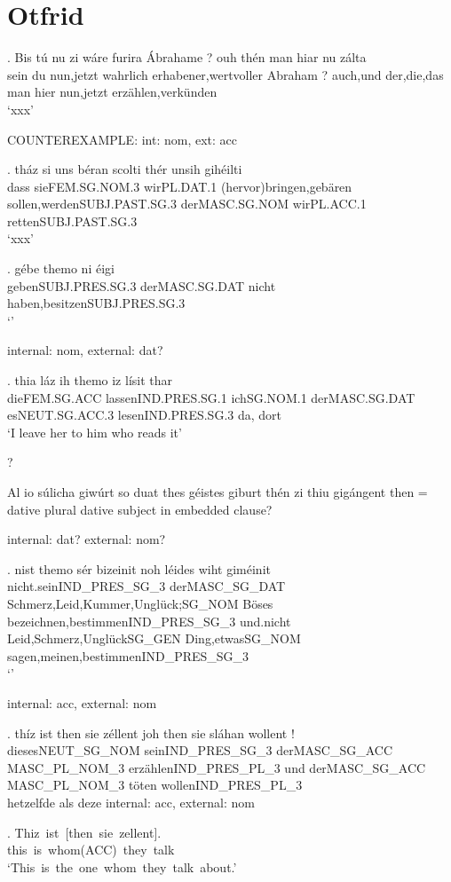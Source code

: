 \phantom{x}

\section{Otfrid}

\exg. Bis tú nu {zi wáre} furira Ábrahame ? ouh thén man hiar nu zálta\\
 sein du nun,jetzt wahrlich erhabener,wertvoller Abraham ? auch,und der,die,das man hier nun,jetzt erzählen,verkünden\\
 `xxx' \label{ex:ohg-dat-acc}

COUNTEREXAMPLE: int: nom, ext: acc

\exg. tház	si	uns	béran	scolti	thér	unsih	gihéilti\\
dass	sieFEM.SG.NOM.3	wirPL.DAT.1	(hervor)bringen,gebären	sollen,werdenSUBJ.PAST.SG.3	derMASC.SG.NOM	wirPL.ACC.1	rettenSUBJ.PAST.SG.3\\
 `xxx' 

 \exg. gébe themo	ni	éigi\\
 gebenSUBJ.PRES.SG.3	derMASC.SG.DAT	nicht	haben,besitzenSUBJ.PRES.SG.3\\
 `' 

  internal: nom, external: dat?

  \exg. thia	láz	ih	themo	iz	lísit	thar\\
  dieFEM.SG.ACC	lassenIND.PRES.SG.1	ichSG.NOM.1	derMASC.SG.DAT	esNEUT.SG.ACC.3	lesenIND.PRES.SG.3	da, dort\\
  `I leave her to him who reads it' 


?

Al	io	súlicha	giwúrt	so	duat	thes	géistes	giburt	thén	zi	thiu	gigángent
then = dative plural
dative subject in embedded clause?

internal: dat? external: nom?

\exg. nist	themo	sér	bizeinit	noh	léides	wiht	giméinit\\
nicht.seinIND_PRES_SG_3	derMASC_SG_DAT	Schmerz,Leid,Kummer,Unglück;SG_NOM Böses	bezeichnen,bestimmenIND_PRES_SG_3 und.nicht Leid,Schmerz,UnglückSG_GEN	Ding,etwasSG_NOM	sagen,meinen,bestimmenIND_PRES_SG_3\\
  `' 



internal: acc, external: nom

\exg. thíz	ist	then	sie	zéllent	joh	then	sie	sláhan	wollent	!\\
diesesNEUT_SG_NOM	seinIND_PRES_SG_3	derMASC_SG_ACC	MASC_PL_NOM_3	erzählenIND_PRES_PL_3		und	derMASC_SG_ACC	MASC_PL_NOM_3	töten	wollenIND_PRES_PL_3\\

hetzelfde als deze
internal: acc, external: nom

\exg. Thiz ist [then sie zellent].\\
 this is whom(ACC) they talk\\
 `This is the one whom they talk about.' 



\phantom{x}
